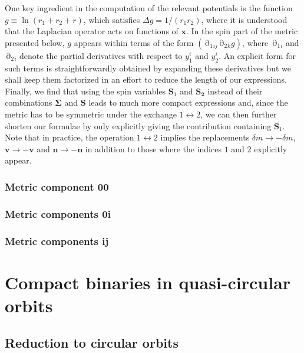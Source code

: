 \documentclass[
superscriptaddress,
preprint,
prd,tightenlines,showpacs,nofootinbib,
eqsecnum,
amsfonts,amsmath,amssymb]{revtex4-1}
\begin{document}
One key ingredient in the computation of the relevant potentials is
the function $g\equiv\ln (r_1+r_2+r)$, which satisfies $\Delta
g=1/(r_1 r_2)$, where it is understood that the Laplacian operator
acts on functions of $\mathbf{x}$. In the spin part of the metric
presented below, $g$ appears within terms of the form
$(\mathop{\partial}_{1}\!{}_{ij}\mathop{\partial}_{2}\!{}_{k}g)$,
where $\mathop{\partial}_{1}\!{}_{i}$ and
$\mathop{\partial}_{2}\!{}_{i}$ denote the partial derivatives with
respect to $y_1^i$ and $y_2^i$. An explicit form for such terms is
straightforwardly obtained by expanding these derivatives but we shall
keep them factorized in an effort to reduce the length of our
expressions. Finally, we find that using the spin variables
$\mathbf{S}_1$ and $\mathbf{S_2}$ instead of their combinations
$\mathbf{\Sigma}$ and $\mathbf{S}$ leads to much more compact
expressions and, since the metric has to be symmetric under the
exchange $1 \leftrightarrow 2$, we can then further shorten our
formulae by only explicitly giving the contribution containing
$\mathbf{S}_1$. Note that in practice, the operation $1
\leftrightarrow 2$ implies the replacements $\delta m \rightarrow
-\delta m$, $\mathbf{v}\rightarrow -\mathbf{v}$ and
$\mathbf{n}\rightarrow -\mathbf{n}$ in addition to those where the
indices $1$ and $2$ explicitly appear.

\subsubsection{Metric component 00}


\subsubsection{Metric components 0i}


\subsubsection{Metric components ij}


\section{Compact binaries in quasi-circular orbits}
\label{sec:CO}

\subsection{Reduction to circular orbits}
\label{subsec:COreductiondefs}
\end{document}
